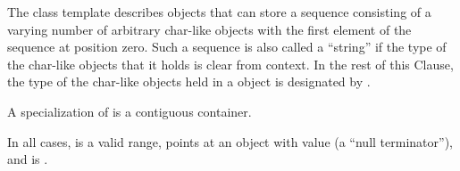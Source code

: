\pnum
{}%
The
class template
describes objects that can store a sequence consisting of a varying number of
arbitrary char-like objects with the first element of the sequence at position zero.
Such a sequence is also called a ``string'' if the type of the
char-like objects that it holds
is clear from context.
In the rest of this Clause,
the type of the char-like objects held in a  object
is designated by .

\pnum
A specialization of  is a contiguous container.

\pnum
In all cases,
 is a valid range,
 points at an object with value 
(a ``null terminator''),
and  is .


